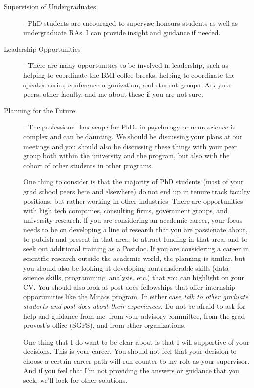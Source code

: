 \documentclass{article}
\begin{document}
\begin{description}
\item [Supervision of Undergraduates] - PhD students are encouraged to supervise honours students as well as undergraduate RAs. I can provide insight and guidance if needed.

\item [Leadership Opportunities] - There are many opportunities to be involved in leadership, such as helping to coordinate the BMI coffee breaks, helping to coordinate the speaker series, conference organization, and student groups. Ask your peers, other faculty, and me about these if you are not sure. 

\item [Planning for the Future] - The professional landscape for PhDs in psychology or neuroscience is complex and can be daunting. We should be discussing your plans at our meetings and you should also be discussing these things with your peer group both within the university and the program, but also with the cohort of other students in other programs.

One thing to consider is that the majority of PhD students (most of your grad school peers here and elsewhere) do not end up in tenure track faculty positions, but rather working in other industries. There are opportunities with high tech companies, consulting firms, government groups, and university research. If you are considering an academic career, your focus needs to be on developing a line of research that you are passionate about, to publish and present in that area, to attract funding in that area, and to seek out additional training as a Postdoc. If you are considering a career in scientific research outside the academic world, the planning is similar, but you should also be looking at developing nontransferable skills (data science skills, programming, analysis, etc.) that you can highlight on your CV. You should also look at post docs fellowships that offer internship opportunities like the \href{https://www.mitacs.ca/en}{Mitacs} program. In either case \textit{talk to other graduate students and post docs about their experiences.} Do not be afraid to ask for help and guidance from me, from your advisory committee, from the grad provost's office (SGPS), and from other organizations.  

One thing that I do want to be clear about is that I will supportive of your decisions. This is your career. You should not feel that your decision to choose a certain career path will run counter to my role as your supervisor. And if you feel that I'm not providing the answers or guidance that you seek, we'll look for other solutions. 


\end{description}
\end{document}
